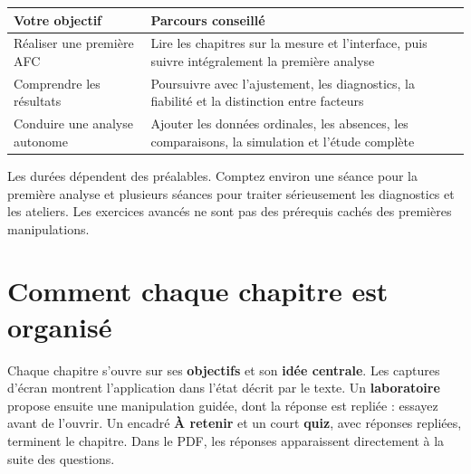 \documentclass[
  french,
  11pt,
  a4paper,
  DIV=11,
  numbers=noendperiod]{scrreprt}
\newcounter{none} %
\begin{document}


{\def\LTcaptype{none} %
\begin{longtable}[]{@{}
  >{\raggedright\arraybackslash}p{}
  >{\raggedright\arraybackslash}p{}@{}}
\toprule\noalign{}
\begin{minipage}[b]{\linewidth}\raggedright
Votre objectif
\end{minipage} & \begin{minipage}[b]{\linewidth}\raggedright
Parcours conseillé
\end{minipage} \\
\midrule\noalign{}
\endhead
\bottomrule\noalign{}
\endlastfoot
Réaliser une première AFC & Lire les chapitres sur la mesure et
l'interface, puis suivre intégralement la première analyse \\
Comprendre les résultats & Poursuivre avec l'ajustement, les
diagnostics, la fiabilité et la distinction entre facteurs \\
Conduire une analyse autonome & Ajouter les données ordinales, les
absences, les comparaisons, la simulation et l'étude complète \\
\end{longtable}
}

Les durées dépendent des préalables. Comptez environ une séance pour la
première analyse et plusieurs séances pour traiter sérieusement les
diagnostics et les ateliers. Les exercices avancés ne sont pas des
prérequis cachés des premières manipulations.

\section*{Comment chaque chapitre est
organisé}\label{comment-chaque-chapitre-est-organisuxe9}


Chaque chapitre s'ouvre sur ses \textbf{objectifs} et son \textbf{idée
centrale}. Les captures d'écran montrent l'application dans l'état
décrit par le texte. Un \textbf{laboratoire} propose ensuite une
manipulation guidée, dont la réponse est repliée : essayez avant de
l'ouvrir. Un encadré \textbf{À retenir} et un court \textbf{quiz}, avec
réponses repliées, terminent le chapitre. Dans le PDF, les réponses
apparaissent directement à la suite des questions.
\end{document}
